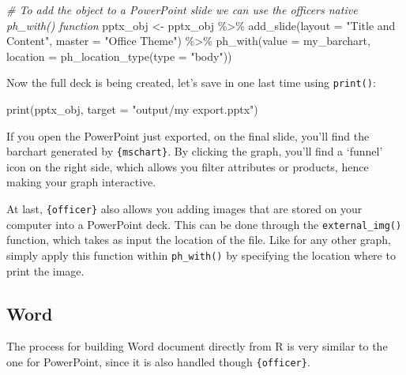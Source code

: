 \documentclass[
]{krantz}
\makeatletter
\newenvironment{Shaded}{\begin{snugshade}}{\end{snugshade}}
\newcommand{\AttributeTok}[1]{\textcolor[rgb]{0.61,0.61,0.61}{#1}}
\newcommand{\CommentTok}[1]{\textcolor[rgb]{0.37,0.37,0.37}{\textit{#1}}}
\newcommand{\FunctionTok}[1]{\textcolor[rgb]{0,0,0}{#1}}
\newcommand{\NormalTok}[1]{#1}
\newcommand{\OtherTok}[1]{\textcolor[rgb]{0.37,0.37,0.37}{#1}}
\newcommand{\SpecialCharTok}[1]{\textcolor[rgb]{0,0,0}{#1}}
\newcommand{\StringTok}[1]{\textcolor[rgb]{0.5,0.5,0.5}{#1}}
\newenvironment{kframe}{%
\medskip{}
\setlength{\fboxsep}{.8em}
 \def\at@end@of@kframe{}%
 \ifinner\ifhmode%
  \def\at@end@of@kframe{\end{minipage}}%
  \begin{minipage}{\columnwidth}%
 \fi\fi%
 \def\FrameCommand##1{\hskip\@totalleftmargin \hskip-\fboxsep
 \colorbox{shadecolor}{##1}\hskip-\fboxsep
     \hskip-\linewidth \hskip-\@totalleftmargin \hskip\columnwidth}%
 \MakeFramed {\advance\hsize-\width
   \@totalleftmargin\z@ \linewidth\hsize
   \@setminipage}}%
 {\par\unskip\endMakeFramed%
 \at@end@of@kframe}
\renewenvironment{Shaded}{\begin{kframe}}{\end{kframe}}
\makeatother
\begin{document}
\begin{Shaded}
\begin{Highlighting}[]
\CommentTok{\# To add the object to a PowerPoint slide we can use the officer\textquotesingle{}s native ph\_with() function}
\NormalTok{pptx\_obj }\OtherTok{\textless{}{-}}\NormalTok{ pptx\_obj }\SpecialCharTok{\%\textgreater{}\%}
  \FunctionTok{add\_slide}\NormalTok{(}\AttributeTok{layout =} \StringTok{"Title and Content"}\NormalTok{, }\AttributeTok{master =} \StringTok{"Office Theme"}\NormalTok{) }\SpecialCharTok{\%\textgreater{}\%}
  \FunctionTok{ph\_with}\NormalTok{(}\AttributeTok{value =}\NormalTok{ my\_barchart, }\AttributeTok{location =} \FunctionTok{ph\_location\_type}\NormalTok{(}\AttributeTok{type =} \StringTok{"body"}\NormalTok{))}
\end{Highlighting}
\end{Shaded}

Now the full deck is being created, let's save in one last time using \texttt{print()}:

\begin{Shaded}
\begin{Highlighting}[]
\FunctionTok{print}\NormalTok{(pptx\_obj, }\AttributeTok{target =} \StringTok{"output/my export.pptx"}\NormalTok{)}
\end{Highlighting}
\end{Shaded}

If you open the PowerPoint just exported, on the final slide, you'll find the barchart generated by \texttt{\{mschart\}}. By clicking the graph, you'll find a `funnel' icon on the right side, which allows you filter attributes or products, hence making your graph interactive.

At last, \texttt{\{officer\}} also allows you adding images that are stored on your computer into a PowerPoint deck. This can be done through the \texttt{external\_img()} function, which takes as input the location of the file. Like for any other graph, simply apply this function within \texttt{ph\_with()} by specifying the location where to print the image.

\hypertarget{word}{%
\subsection{Word}\label{word}}

The process for building Word document directly from R is very similar to the one for PowerPoint, since it is also handled though \texttt{\{officer\}}.
\end{document}
